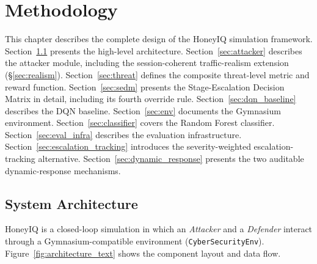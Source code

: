 \chapter{Methodology}
\label{ch:methodology}

This chapter describes the complete design of the HoneyIQ simulation
framework.
Section~\ref{sec:arch} presents the high-level architecture.
Section~\ref{sec:attacker} describes the attacker module, including the
session-coherent traffic-realism extension (\S\ref{sec:realism}).
Section~\ref{sec:threat} defines the composite threat-level metric and
reward function.
Section~\ref{sec:sedm} presents the Stage-Escalation Decision Matrix in
detail, including its fourth override rule.
Section~\ref{sec:dqn_baseline} describes the DQN baseline.
Section~\ref{sec:env} documents the Gymnasium environment.
Section~\ref{sec:classifier} covers the Random Forest classifier.
Section~\ref{sec:eval_infra} describes the evaluation infrastructure.
Section~\ref{sec:escalation_tracking} introduces the severity-weighted
escalation-tracking alternative.
Section~\ref{sec:dynamic_response} presents the two auditable
dynamic-response mechanisms.

\section{System Architecture}
\label{sec:arch}

HoneyIQ is a closed-loop simulation in which an \emph{Attacker} and a
\emph{Defender} interact through a Gymnasium-compatible environment
(\texttt{CyberSecurityEnv}).
Figure~\ref{fig:architecture_text} shows the component layout and data flow.

